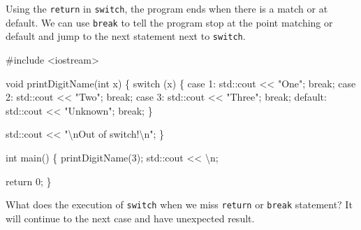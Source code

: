 \documentclass[
  letterpaper,
  DIV=11,
  numbers=noendperiod]{scrreprt}
\newenvironment{Shaded}{\begin{snugshade}}{\end{snugshade}}
\newcommand{\CommentTok}[1]{\textcolor[rgb]{0.37,0.37,0.37}{#1}}
\newcommand{\ControlFlowTok}[1]{\textcolor[rgb]{0.00,0.23,0.31}{#1}}
\newcommand{\DecValTok}[1]{\textcolor[rgb]{0.68,0.00,0.00}{#1}}
\newcommand{\ErrorTok}[1]{\textcolor[rgb]{0.68,0.00,0.00}{#1}}
\newcommand{\FunctionTok}[1]{\textcolor[rgb]{0.28,0.35,0.67}{#1}}
\newcommand{\NormalTok}[1]{\textcolor[rgb]{0.00,0.23,0.31}{#1}}
\newcommand{\SpecialCharTok}[1]{\textcolor[rgb]{0.37,0.37,0.37}{#1}}
\newcommand{\StringTok}[1]{\textcolor[rgb]{0.13,0.47,0.30}{#1}}
\begin{document}
Using the \texttt{return} in \texttt{switch}, the program ends when
there is a match or at default. We can use \texttt{break} to tell the
program stop at the point matching or default and jump to the next
statement next to \texttt{switch}.

\begin{Shaded}
\begin{Highlighting}[]
\CommentTok{\#include \textless{}iostream\textgreater{}}

\NormalTok{void }\FunctionTok{printDigitName}\NormalTok{(int x)}
\NormalTok{\{}
    \ControlFlowTok{switch}\NormalTok{ (x)}
\NormalTok{    \{}
\NormalTok{    case }\DecValTok{1}\SpecialCharTok{:}
\NormalTok{        std}\SpecialCharTok{::}\NormalTok{cout }\SpecialCharTok{\textless{}}\ErrorTok{\textless{}} \StringTok{"One"}\NormalTok{;}
        \ControlFlowTok{break}\NormalTok{;}
\NormalTok{    case }\DecValTok{2}\SpecialCharTok{:}
\NormalTok{        std}\SpecialCharTok{::}\NormalTok{cout }\SpecialCharTok{\textless{}}\ErrorTok{\textless{}} \StringTok{"Two"}\NormalTok{;}
        \ControlFlowTok{break}\NormalTok{;}
\NormalTok{    case }\DecValTok{3}\SpecialCharTok{:}
\NormalTok{        std}\SpecialCharTok{::}\NormalTok{cout }\SpecialCharTok{\textless{}}\ErrorTok{\textless{}} \StringTok{"Three"}\NormalTok{;}
        \ControlFlowTok{break}\NormalTok{;}
\NormalTok{    default}\SpecialCharTok{:}
\NormalTok{        std}\SpecialCharTok{::}\NormalTok{cout }\SpecialCharTok{\textless{}}\ErrorTok{\textless{}} \StringTok{"Unknown"}\NormalTok{;}
        \ControlFlowTok{break}\NormalTok{;}
\NormalTok{    \}}

\NormalTok{    std}\SpecialCharTok{::}\NormalTok{cout }\SpecialCharTok{\textless{}}\ErrorTok{\textless{}} \StringTok{"}\SpecialCharTok{\textbackslash{}n}\StringTok{Out of switch!}\SpecialCharTok{\textbackslash{}n}\StringTok{"}\NormalTok{;}
\NormalTok{\}}

\NormalTok{int }\FunctionTok{main}\NormalTok{()}
\NormalTok{\{}
    \FunctionTok{printDigitName}\NormalTok{(}\DecValTok{3}\NormalTok{);}
\NormalTok{    std}\SpecialCharTok{::}\NormalTok{cout }\SpecialCharTok{\textless{}}\ErrorTok{\textless{}} \StringTok{\textquotesingle{}}\SpecialCharTok{\textbackslash{}n}\StringTok{\textquotesingle{}}\NormalTok{;}

\NormalTok{    return }\DecValTok{0}\NormalTok{;}
\NormalTok{\}}
\end{Highlighting}
\end{Shaded}

What does the execution of \texttt{switch} when we miss \texttt{return}
or \texttt{break} statement? It will continue to the next case and have
unexpected result.
\end{document}
